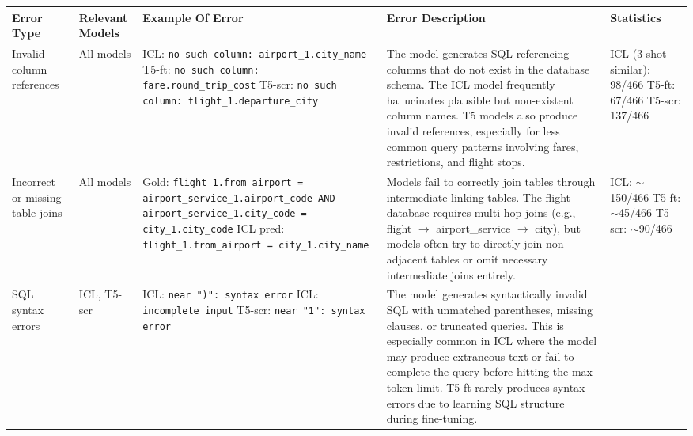 \documentclass{article}
\begin{document}
\begin{landscape}
\begin{table}
  \centering
  \small
  \begin{tabular}{p{2.2cm}p{2cm}p{5.5cm}p{5.5cm}p{5.5cm}}
    \toprule
    \textbf{Error Type} & \textbf{Relevant Models} & \textbf{Example Of Error} & \textbf{Error Description} & \textbf{Statistics} \\
    \midrule
    Invalid column references & All models &
    ICL: \texttt{no such column: airport\_1.city\_name} \newline
    T5-ft: \texttt{no such column: fare.round\_trip\_cost} \newline
    T5-scr: \texttt{no such column: flight\_1.departure\_city} &
    The model generates SQL referencing columns that do not exist in the database schema. The ICL model frequently hallucinates plausible but non-existent column names. T5 models also produce invalid references, especially for less common query patterns involving fares, restrictions, and flight stops. &
    ICL (3-shot similar): 98/466 \newline
    T5-ft: 67/466 \newline
    T5-scr: 137/466 \\
    \midrule
    Incorrect or missing table joins & All models &
    Gold: \texttt{flight\_1.from\_airport = airport\_service\_1.airport\_code AND airport\_service\_1.city\_code = city\_1.city\_code} \newline
    ICL pred: \texttt{flight\_1.from\_airport = city\_1.city\_name} &
    Models fail to correctly join tables through intermediate linking tables. The flight database requires multi-hop joins (e.g., flight $\rightarrow$ airport\_service $\rightarrow$ city), but models often try to directly join non-adjacent tables or omit necessary intermediate joins entirely. &
    ICL: ${\sim}$150/466 \newline
    T5-ft: ${\sim}$45/466 \newline
    T5-scr: ${\sim}$90/466 \\
    \midrule
    SQL syntax errors & ICL, T5-scr &
    ICL: \texttt{near ")": syntax error} \newline
    ICL: \texttt{incomplete input} \newline
    T5-scr: \texttt{near "1": syntax error} &
    The model generates syntactically invalid SQL with unmatched parentheses, missing clauses, or truncated queries. This is especially common in ICL where the model may produce extraneous text or fail to complete the query before hitting the max token limit. T5-ft rarely produces syntax errors due to learning SQL structure during fine-tuning. &

\end{tabular}
\end{table}
\end{landscape}
\end{document}
